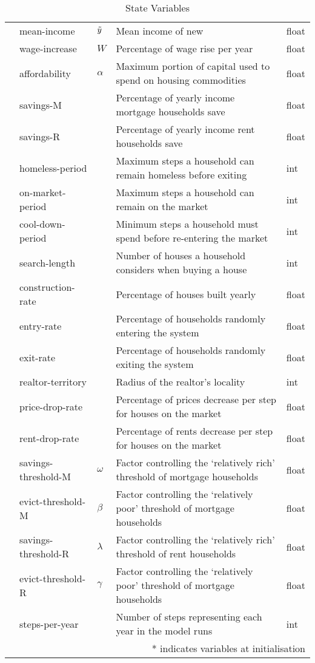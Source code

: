 \begin{table}[H]
\begin{tabular}{l l l l l}
        & mean-income & \(\Tilde{y}\) & Mean income of new \M{households} & float \\
        & wage-increase & \(W\) & Percentage of wage rise per year & float \\
        & affordability & \(\alpha\) & Maximum portion of capital used to spend on housing commodities & float \\
        & savings-M & & Percentage of yearly income mortgage households save & float \\
        & savings-R & & Percentage of yearly income rent households save & float \\
        & homeless-period & & Maximum steps a household can remain homeless before exiting & int \\
        & on-market-period & & Maximum steps a household can remain on the market & int \\
        & cool-down-period & & Minimum steps a household must spend before re-entering the market & int \\
        & search-length & & Number of houses a household considers when buying a house & int \\
        & construction-rate & & Percentage of houses built yearly & float \\
        & entry-rate & & Percentage of households randomly entering the system & float \\
        & exit-rate & & Percentage of households randomly exiting the system  & float \\
        & realtor-territory & & Radius of the realtor's locality & int \\
        & price-drop-rate & & Percentage of prices decrease per step for houses on the market & float \\
        & rent-drop-rate & & Percentage of rents decrease per step for houses on the market & float \\
        & savings-threshold-M & \(\omega\) & Factor controlling the `relatively rich' threshold of mortgage households & float \\
        & evict-threshold-M & \(\beta\) & Factor controlling the `relatively poor' threshold of mortgage households & float \\
        & savings-threshold-R & \(\lambda\) & Factor controlling the `relatively rich' threshold of rent households & float \\
        & evict-threshold-R & \(\gamma\) & Factor controlling the `relatively poor' threshold of mortgage households & float \\
        & steps-per-year & & Number of steps representing each year in the model runs & int \\
    
	\bottomrule		
    \multicolumn{5}{r}{* indicates \M{external} variables at initialisation} \\
	\end{tabular}
	\caption{State Variables}
	\label{tab:1}	
\end{table}

